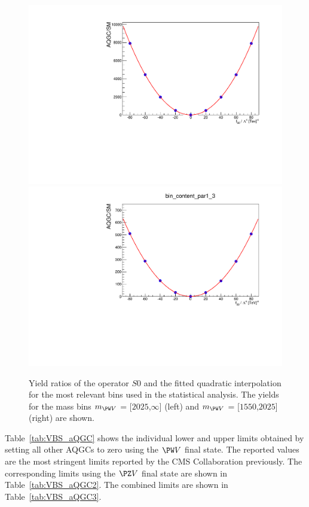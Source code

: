 \begin{figure}[htb]
\centering
\includegraphics[width=\cmsFigWidth]{Plots/plots/aqgc_pol2.pdf}
\includegraphics[width=\cmsFigWidth]{Plots/plots/aqgc_pol2_bin.pdf}
\caption{Yield ratios of the operator $S0$ and the fitted quadratic interpolation for the most relevant bins used in the statistical analysis. The yields for the mass bins $m_{\PW V}$ = [$2025$,$\infty$] (left) and  $m_{\PW V}$ = [$1550$,$2025$] (right) are shown.}
\label{fig:aqgc_pol}
\end{figure}

Table~\ref{tab:VBS_aQGC} shows the individual lower and upper limits obtained by setting all other AQGCs to zero using the $\PW V$ final state. The reported values are the most stringent limits reported by the CMS Collaboration previously. The corresponding limits using the $\PZ V$ final state are shown in Table~\ref{tab:VBS_aQGC2}. The combined limits are shown in Table~\ref{tab:VBS_aQGC3}.

